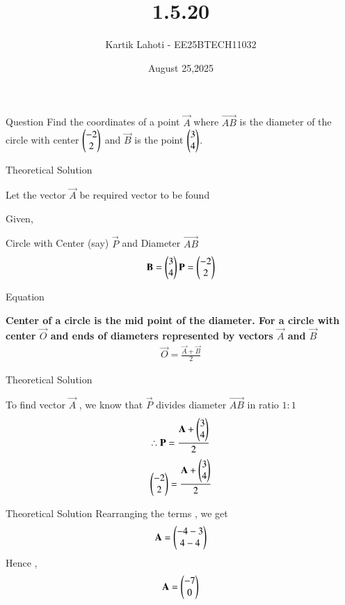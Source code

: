 \documentclass{beamer}
\title %
{1.5.20}
\date{August 25,2025}
\author 
{Kartik Lahoti - EE25BTECH11032}
\begin{document}
\frame{\titlepage}
\begin{frame}{Question}
Find the coordinates of a point $\vec{A}$ where $\vec{AB}$ is the diameter of the circle with center $\begin{pmatrix}-2\\2 \end{pmatrix}$ and $\vec{B}$ is the point $\begin{pmatrix}3\\4\end{pmatrix}$.
\end{frame}



\begin{frame}{Theoretical Solution}

Let the vector $\vec{A}$  be required vector to be found

Given,

Circle with Center (say) $\vec{P}$ and
Diameter $\vec{AB}$ 
\begin{align}
    \mathbf{B}=\begin{pmatrix}3\\4\end{pmatrix} \mathbf{P} = \begin{pmatrix}-2\\2\end{pmatrix}
\end{align}

\end{frame}

\begin{frame}{Equation}

\textbf{Center of a circle is the mid point of the diameter. For a circle with center $\vec{O}$ and ends of diameters represented by vectors $\vec{A}$ and $\vec{B}$  }
\begin{align}
    \vec{O}=\frac{\vec{A}+\vec{B}}{2}
\end{align}

\end{frame}

\begin{frame}{Theoretical Solution}

To find vector $\vec{A}$ , we know that $\vec{P}$ divides diameter $\vec{AB}$ in ratio $1\colon1$
\begin{align}
    \therefore \mathbf{P} = \frac{\mathbf{A} + \begin{pmatrix}3\\4\end{pmatrix}  }{2} 
\end{align}
\begin{align}
    \begin{pmatrix}-2\\2\end{pmatrix} = \frac{\mathbf{A} + \begin{pmatrix}3\\4\end{pmatrix}}{2}    
\end{align}

\end{frame}

\begin{frame}{Theoretical Solution}
Rearranging the terms , we get  
\begin{align}
    \mathbf{A} = \begin{pmatrix}-4-3\\4-4\end{pmatrix} 
\end{align}
Hence , 
\begin{align}
    \mathbf{A} = \begin{pmatrix}-7\\0\end{pmatrix}
\end{align}

\end{frame}
\end{document}
